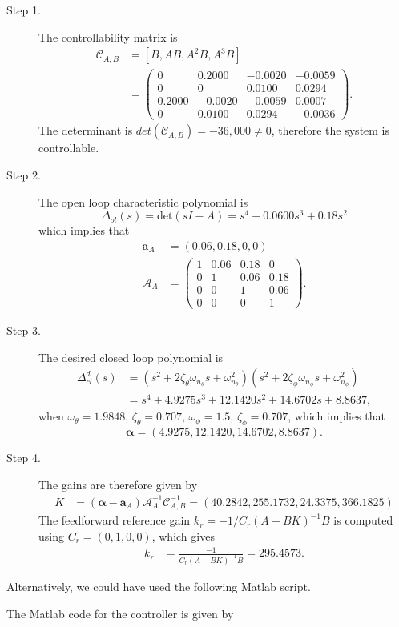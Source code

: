 \begin{description}
\item[Step 1.] 
The controllability matrix is 
\begin{align*}
\mathcal{C}_{A,B} &= [B, AB, A^2B, A^3B] \\
 	&= \begin{pmatrix}           
        0  &  0.2000  & -0.0020  & -0.0059 \\
         0 &        0 &   0.0100 &   0.0294 \\
    0.2000 &  -0.0020 &  -0.0059 &   0.0007 \\
         0 &   0.0100 &   0.0294 &  -0.0036 \end{pmatrix}.
\end{align*}
The determinant is $det(\mathcal{C}_{A,B})=-36,000\neq 0$, therefore the system is controllable.  
\item[Step 2.] The open loop characteristic polynomial is
\[
\Delta_{ol}(s)=\text{det}(sI-A) = s^4 + 0.0600 s^3 + 0.18 s^2 
\]
which implies that
\begin{align*}
\mathbf{a}_A &= (0.06, 0.18, 0, 0) \\
\mathcal{A}_A &= \begin{pmatrix} 
1 & 0.06 & 0.18 & 0 \\ 0 & 1 & 0.06 & 0.18 \\ 0 & 0 & 1 & 0.06 \\ 0 & 0 & 0 & 1
\end{pmatrix}.
\end{align*}

\item[Step 3.] The desired closed loop polynomial is
\begin{align*}
\Delta_{cl}^d(s) &= (s^2+2\zeta_{\theta}\omega_{n_\theta} s + \omega_{n_\theta}^2)(s^2+2\zeta_{\phi}\omega_{n_\phi} s + \omega_{n_\phi}^2) \\
&=s^4 + 4.9275 s^3 + 12.1420 s^2 + 14.6702 s + 8.8637,              
\end{align*}
when $\omega_\theta = 1.9848$, $\zeta_\theta = 0.707$, $\omega_\phi=1.5$, $\zeta_\phi = 0.707$, 
which implies that
\[
\boldsymbol{\alpha} = (4.9275,   12.1420,   14.6702,    8.8637).
\]

\item[Step 4.]
The gains are therefore given by
\begin{align*}
K &= (\boldsymbol{\alpha}-\mathbf{a}_A)\mathcal{A}_A^{-1}\mathcal{C}_{A,B}^{-1} 
  = (40.2842,  255.1732,   24.3375,  366.1825)
\end{align*}
The feedforward reference gain $k_r=-1/C_r(A-BK)^{-1}B$ is computed using $C_r=(0,1,0,0)$, which gives
\begin{align*}
k_r &= \frac{-1}{C_r(A-BK)^{-1}B} 
    = 295.4573.
\end{align*}
\end{description}

Alternatively, we could have used the following Matlab script.


The Matlab code for the controller is given by

